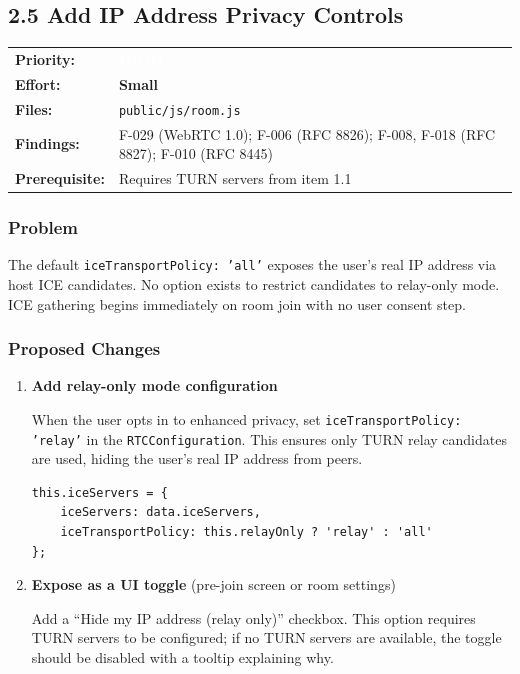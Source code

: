 \documentclass[11pt,letterpaper]{article}
\newcommand{\prihigh}{\colorbox{major}{\textcolor{white}{\small\textbf{HIGH}}}}
\newcommand{\effsmall}{\colorbox{compliant!30}{\small\textbf{Small}}}
\begin{document}
\subsection{2.5 Add IP Address Privacy Controls}

\begin{tabular}{ll}
\textbf{Priority:} & \prihigh \\
\textbf{Effort:} & \effsmall \\
\textbf{Files:} & \texttt{public/js/room.js} \\
\textbf{Findings:} & F-029 (WebRTC 1.0); F-006 (RFC 8826); F-008, F-018 (RFC 8827); F-010 (RFC 8445) \\
\textbf{Prerequisite:} & Requires TURN servers from item 1.1 \\
\end{tabular}

\subsubsection{Problem}

The default \texttt{iceTransportPolicy: 'all'} exposes the user's real IP address via host ICE candidates. No option exists to restrict candidates to relay-only mode. ICE gathering begins immediately on room join with no user consent step.

\subsubsection{Proposed Changes}

\begin{enumerate}[leftmargin=2em]
    \item \textbf{Add relay-only mode configuration}

    When the user opts in to enhanced privacy, set \texttt{iceTransportPolicy: 'relay'} in the \texttt{RTCConfiguration}. This ensures only TURN relay candidates are used, hiding the user's real IP address from peers.

    \begin{verbatim}
this.iceServers = {
    iceServers: data.iceServers,
    iceTransportPolicy: this.relayOnly ? 'relay' : 'all'
};
    \end{verbatim}

    \item \textbf{Expose as a UI toggle} (pre-join screen or room settings)

    Add a ``Hide my IP address (relay only)'' checkbox. This option requires TURN servers to be configured; if no TURN servers are available, the toggle should be disabled with a tooltip explaining why.
\end{enumerate}
\end{document}
